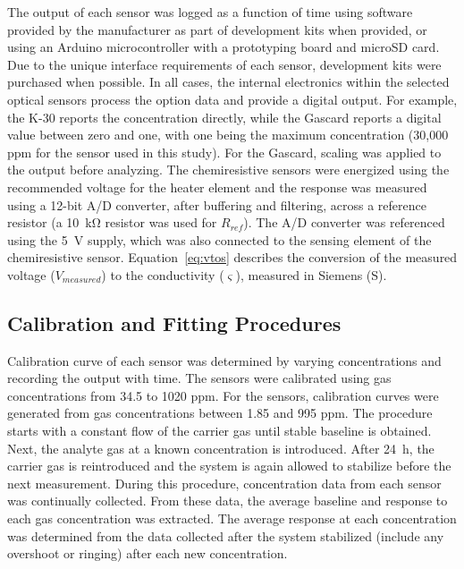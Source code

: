 \documentclass[sensors,article,submit,moreauthors,pdftex]{Definitions/mdpi}
\begin{document}
			The output of each sensor was logged as a function of time using software provided by the manufacturer as part of development kits when provided, or using an Arduino microcontroller with a prototyping board and microSD card.
			Due to the unique interface requirements of each sensor, development kits were purchased when possible.
			In all cases, the internal electronics within the selected optical sensors process the option data and provide a digital output.
			For example, the K-30 reports the concentration directly, while the Gascard reports a digital value between zero and one, with one being the maximum concentration (30,000 ppm  for the sensor used in this study).
			For the Gascard, scaling was applied to the output before analyzing.
			The chemiresistive sensors were energized using the recommended voltage for the heater element and the response was measured using a 12-bit A/D converter, after buffering and filtering, across a reference resistor (a \SI{10}{\kilo\ohm} resistor was used for $R_{ref}$).
			The A/D converter was referenced using the \SI{5}{\volt} supply, which was also connected to the sensing element of the chemiresistive sensor. Equation~\ref{eq:vtos} describes the conversion of the measured voltage ($V_{measured}$) to the conductivity ($\varsigma$), measured in Siemens (S).
			
	
		\subsection{Calibration and Fitting Procedures}
			\label{sec:method_cal}
			
			Calibration curve of each sensor was determined by varying concentrations and recording the output with time.
			The  sensors were calibrated using gas concentrations from 34.5 to 1020 ppm.
			For the  sensors, calibration curves were generated from gas concentrations between 1.85 and 995 ppm.
			 The procedure starts with a constant flow of the carrier gas until stable baseline is obtained.
			Next, the analyte gas at a known concentration is introduced.
			After \SI{24}{\hour}, the carrier gas is reintroduced and the system is again allowed to stabilize before the next measurement. 
			During this procedure, concentration data from each sensor was continually collected. 
			From these data, the average baseline and response to each gas concentration was extracted.
			The average response at each concentration was determined from the data collected after the system stabilized (include any overshoot or ringing) after each new concentration.
			
\end{document}

